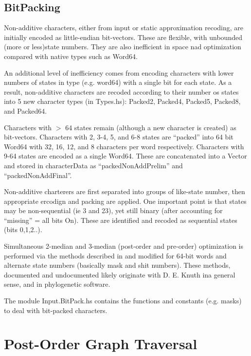 \documentclass[11pt]{article}
\begin{document}
		\subsection{BitPacking}
		Non-additive characters, either from input or static approximation recoding, are initially 
		encoded as little-endian bit-vectors.  These are flexible, with unbounded (more or less)state numbers.
		They are also inefficient in space nad optimization compared with native types such as Word64. 
		
		An additional level of inefficiency comes from encoding characters with lower numbers of states in type (e.g. word64) with a single bit for each state.  As a result, non-additive characters are recoded according to their 
		number os states into 5 new character types (in Types.hs): Packed2, Packed4, Packed5, Packed8, and Packed64. 
		
		Characters with $>$ 64 states remain (although a new character is created) as bit-vectors.  Characters with 
		2, 3-4, 5, and 6-8 states are ``packed'' into 64 bit Word64 with 32, 16, 12, and 8 characters per word respectively. Characters with 9-64 states are encoded as a single Word64. These are concatenated into a Vector and stored in characterData as ``packedNonAddPrelim'' and ``packedNonAddFinal''.
		
		Non-additive charterers are first separated into groups of like-state number, then appropriate ercodign
		and packing are applied.  One important point is that states may be non-sequential (ie 3 and 23), yet
		still binary (after accounting for ``missing'' = all bits On).  These are identified and recoded as sequential states (bits 0,1,2..).
		
		Simultaneous 2-median and 3-median (post-order and pre-order) optimization is performed via the methods described in \cite{WhiteandHolland2011} and \cite{goloboff2002} modified for 64-bit words and alternate state numbers (basically mask and shit numbers).  These methods, documented and undocumented likely originate with D. E. Knuth ina general sense, and \cite{Farris1988} in phylogenetic software.
		
		The module Input.BitPack.hs contains the functions and constants (e.g. masks) to deal 
		with bit-packed characters.
		
	\section{Post-Order Graph Traversal}
\end{document}
